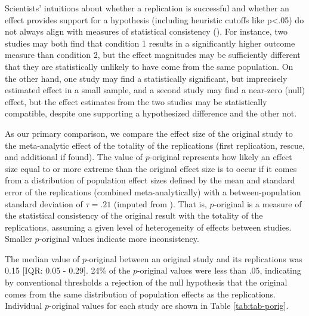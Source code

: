\documentclass[
  english,
  a4paper,
]{article}
\begin{document}
Scientists' intuitions about whether a replication is successful and whether an effect provides support for a hypothesis (including heuristic cutoffs like p\textless.05) do not always align with measures of statistical consistency ().
For instance, two studies may both find that condition 1 results in a significantly higher outcome measure than condition 2, but the effect magnitudes may be sufficiently different that they are statistically unlikely to have come from the same population.
On the other hand, one study may find a statistically significant, but imprecisely estimated effect in a small sample, and a second study may find a near-zero (null) effect, but the effect estimates from the two studies may be statistically compatible, despite one supporting a hypothesized difference and the other not.

As our primary comparison, we compare the effect size of the original study to the meta-analytic effect of the totality of the replications (first replication, rescue, and additional if found).
The value of \(p\)-original represents how likely an effect size equal to or more extreme than the original effect size is to occur if it comes from a distribution of population effect sizes defined by the mean and standard error of the replications (combined meta-analytically) with a between-population standard deviation of \(\tau=.21\) (imputed from ).
That is, \(p\)-original is a measure of the statistical consistency of the original result with the totality of the replications, assuming a given level of heterogeneity of effects between studies.
Smaller \(p\)-original values indicate more inconsistency.

The median value of \(p\)-original between an original study and its replications was 0.15 {[}IQR: 0.05 - 0.29{]}.
24\% of the \(p\)-original values were less than .05, indicating by conventional thresholds a rejection of the null hypothesis that the original comes from the same distribution of population effects as the replications.
Individual \(p\)-original values for each study are shown in Table \ref{tab:tab-porig}.
\end{document}
